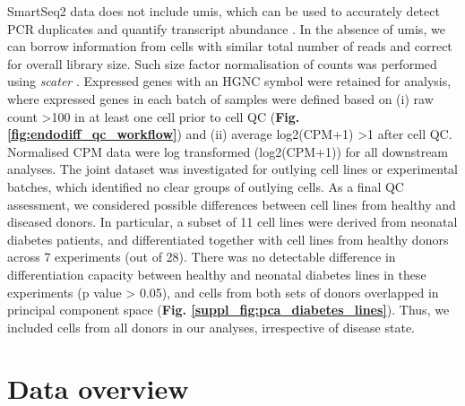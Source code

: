 SmartSeq2 data does not include \glspl{umi}, which can be used to accurately detect PCR duplicates and quantify transcript abundance \cite{smith2017umi, islam2014quantitative, kivioja2012counting}. 
In the absence of \glspl{umi}, we can borrow information from cells with similar total number of reads and correct for overall library size. 
Such size factor normalisation of counts was performed using \textit{scater} \cite{mccarthy2017scater}.
Expressed genes with an HGNC symbol were retained for analysis, where expressed genes in each batch of samples were defined based on (i) raw count >100 in at least one cell prior to cell QC (\textbf{Fig. \ref{fig:endodiff_qc_workflow}}) and (ii) average log2(CPM+1) >1 after cell QC. 
Normalised CPM data were log transformed (log2(CPM+1)) for all downstream analyses. 
The joint dataset was investigated for outlying cell lines or experimental batches, which identified no clear groups of outlying cells. 
As a final QC assessment, we considered possible differences between cell lines from healthy and diseased donors. 
In particular, a subset of 11 cell lines were derived from neonatal diabetes patients, and differentiated together with cell lines from healthy donors across 7 experiments (out of 28). 
There was no detectable difference in differentiation capacity between healthy and neonatal diabetes lines in these experiments (p value > 0.05), and cells from both sets of donors overlapped in principal component space (\textbf{Fig. \ref{suppl_fig:pca_diabetes_lines}}). 
Thus, we included cells from all donors in our analyses, irrespective of disease state.


\newpage

\section{Data overview}
\label{sec:endodiff_overview}

